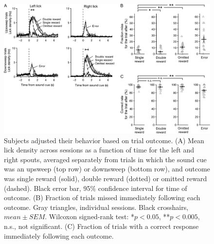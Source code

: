\begin{figure}[htbp]

\begin{center}
\includegraphics[width=\textwidth]{Figures/Chapter2/CC_fig2} 
\end{center}

\caption[Outcome-dependent behavioral adjustments]
{Subjects adjusted their behavior based on trial outcome. (A) Mean lick density across sessions as a function of time for the left and right spouts, averaged separately from trials in which the sound cue was an upsweep (top row) or downsweep (bottom row), and outcome was single reward (solid), double reward (dotted) or omitted reward (dashed). Black error bar, 95\% confidence interval for time of outcome. (B) Fraction of trials missed immediately following each outcome. Gray triangles, individual sessions. Black crosshairs, $\mathit{mean}\pm\mathit{SEM}$. Wilcoxon signed-rank test: *$p < 0.05$, **$p < 0.005$, n.s., not significant. (C) Fraction of trials with a correct response immediately following each outcome.}

\label{fig:CC_fig2}
\end{figure}